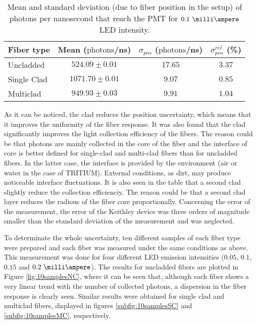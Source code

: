 \begin{table}[htbp]
\centering{}%
\begin{tabular}{lccc}
\toprule 
Fiber type & Mean ($\text{photons}$/ns) & $\sigma_{pos}$ ($\text{photons}$/ns) & $\sigma^{rel}_{pos}$ (\%) \tabularnewline
\midrule
\midrule 
Uncladded & $524.09 \pm 0.01$ & $17.65$ & $3.37$ \tabularnewline
Single Clad & $1071.70 \pm 0.01$ & $9.07$ & $0.85$ \tabularnewline
Multiclad & $949.93 \pm 0.03$ & $9.91$ & $1.04$ \tabularnewline
\bottomrule
\end{tabular}
\caption{Mean and standard deviation (due to fiber position in the setup) of photons per nanosecond that reach the PMT for $0.1~\milli\ampere$ LED intensity.}
\label{tab:PositionStandardDeviation}
\end{table}
As it can be noticed, the clad reduces the position uncertainty, which means that it improves the uniformity of the fiber response. It was also found that the clad significantly improves the light collection efficiency of the fibers. The reason could be that photons are mainly collected in the core of the fiber and the interface of core is better defined for single-clad and multi-clad fibers than for uncladded fibers. In the latter case, the interface is provided by the environment (air or water in the case of TRITIUM). External conditions, as dirt, may produce noticeable interface fluctuations. It is also seen in the table that a second clad slightly reduce the collection efficienciy. The reason could be that a second clad layer reduces the radious of the fiber core proportionally. Concerning the error of the measurement, the error of the Keithley device was three orders of magnitude smaller than the standard deviation of the measurement and was neglected.


To determinate the whole uncertainty, ten different samples of each fiber type were prepared and each fiber was measured under the same conditions as above. This measurement was done for four different LED emission intensities ($0.05$, $0.1$, $0.15$ and $0.2~\milli\ampere$). The results for uncladded fibers are plotted in Figure \ref{fig:10samplesNC}, where it can be seen that, although each fiber shows a very linear trend with the number of collected photons, a dispersion in the fiber response is clearly seen. Similar results were obtained for single clad and multiclad fibers, displayed in figures \ref{subfig:10samplesSC} and \ref{subfig:10samplesMC}, respectively.


